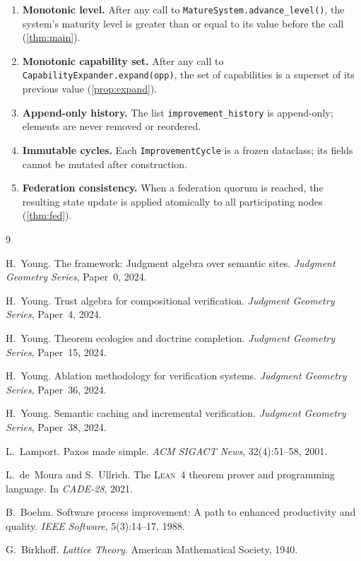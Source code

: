 \documentclass[11pt]{article}
\begin{document}
\begin{enumerate}
  \item \textbf{Monotonic level.}  After any call to
    \texttt{MatureSystem.advance\_level()}, the system's maturity level is
    greater than or equal to its value before the call
    (\cref{thm:main}).

  \item \textbf{Monotonic capability set.}  After any call to
    \texttt{CapabilityExpander.expand(opp)}, the set of capabilities is a
    superset of its previous value (\cref{prop:expand}).

  \item \textbf{Append-only history.}  The list
    \texttt{improvement\_history} is append-only; elements are never
    removed or reordered.

  \item \textbf{Immutable cycles.}  Each \texttt{ImprovementCycle} is a
    frozen dataclass; its fields cannot be mutated after construction.

  \item \textbf{Federation consistency.}  When a federation quorum is
    reached, the resulting state update is applied atomically to all
    participating nodes (\cref{thm:fed}).
\end{enumerate}


\begin{thebibliography}{9}

H.~Young.
\newblock The \JuGeo{} framework: Judgment algebra over semantic sites.
\newblock \textit{Judgment Geometry Series}, Paper~0, 2024.

H.~Young.
\newblock Trust algebra for compositional verification.
\newblock \textit{Judgment Geometry Series}, Paper~4, 2024.

H.~Young.
\newblock Theorem ecologies and doctrine completion.
\newblock \textit{Judgment Geometry Series}, Paper~15, 2024.

H.~Young.
\newblock Ablation methodology for verification systems.
\newblock \textit{Judgment Geometry Series}, Paper~36, 2024.

H.~Young.
\newblock Semantic caching and incremental verification.
\newblock \textit{Judgment Geometry Series}, Paper~38, 2024.

L.~Lamport.
\newblock Paxos made simple.
\newblock \textit{ACM SIGACT News}, 32(4):51--58, 2001.

L.~de~Moura and S.~Ullrich.
\newblock The \textsc{Lean}~4 theorem prover and programming language.
\newblock In \textit{CADE-28}, 2021.

B.~Boehm.
\newblock Software process improvement: A path to enhanced productivity and
quality.
\newblock \textit{IEEE Software}, 5(3):14--17, 1988.

G.~Birkhoff.
\newblock \textit{Lattice Theory}.
\newblock American Mathematical Society, 1940.

\end{thebibliography}
\end{document}
